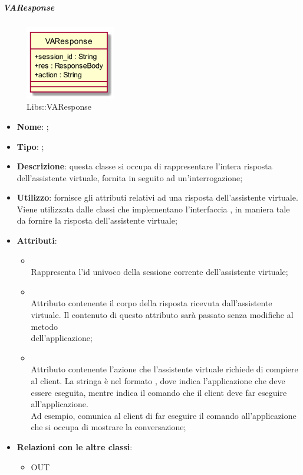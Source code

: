 \hypertarget{VAResponse_label}{\subparagraph{VAResponse}}
\begin{figure}[h]
	\centering
	\includegraphics[width=0.35\textwidth,height=\textheight,keepaspectratio]{images/ClassVAResponse.png}
	\caption{Libs::VAResponse}
\end{figure}
\begin{itemize}
	\item \textbf{Nome}: ;
	\item \textbf{Tipo}: ;
	\item \textbf{Descrizione}: questa classe si occupa di rappresentare l'intera risposta dell'assistente virtuale, fornita in seguito ad un'interrogazione;
	\item \textbf{Utilizzo}: fornisce gli attributi relativi ad una risposta dell'assistente virtuale. Viene utilizzata dalle classi che implementano l'interfaccia , in maniera tale da fornire la risposta dell'assistente virtuale;
	\item \textbf{Attributi}:
	\begin{itemize}
		\item[]  \\
		Rappresenta l'id univoco della sessione corrente dell'assistente virtuale;
		\item[]  \\
		Attributo contenente il corpo della risposta ricevuta dall'assistente virtuale. Il contenuto di questo attributo sarà passato senza modifiche al metodo \\  dell'applicazione;
		\item[]  \\
		Attributo contenente l'azione che l'assistente virtuale richiede di compiere al client. La stringa è nel formato , dove  indica l'applicazione che deve essere eseguita, mentre  indica il comando che il client deve far eseguire all'applicazione. \\
Ad esempio,  comunica al client di far eseguire il comando  all'applicazione che si occupa di mostrare la conversazione;
	\end{itemize}
	\item \textbf{Relazioni con le altre classi}:
	\begin{itemize}
		\item OUT \hyperlink{ResponseBody_label}{}
	\end{itemize}
\end{itemize}
\FloatBarrier

